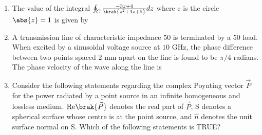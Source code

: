 \documentclass[a4paper, 11pt]{article}
\begin{document}
\begin{enumerate}
    \begin{enumerate}
    \end{enumerate}

    \hfill{}

    \item The value of the integral $\oint_{C}\frac{-3z+4}{\brak{z^{2}+4z+5}}dz$ where c is the circle $\abs{z}=1$ is given by
    
    \begin{enumerate}
    \end{enumerate}

    \hfill{}

    \item A transmission line of characteristic impedance $50$ \ohm is terminated by a $50$ \ohm load. When excited by a sinusoidal voltage source at $10$ GHz, the phase difference between two points spaced $2$ mm apart on the line is found to be $\pi/4$ radians. The phase velocity of the wave along the line is
    
    \begin{enumerate}
    \end{enumerate}

    \hfill{}

    \item Consider the following statements regarding the complex Poynting vector $\vec{P}$ for the power radiated by a point source in an infinite homogeneous and lossless medium. $\text{Re}\brak{\vec{P}}$ denotes the real part of $\vec{P}$, S denotes a spherical surface whose centre is at the point source, and $\hat{n}$ denotes the unit surface normal on S. Which of the following statements is TRUE?
    

\end{enumerate}
\end{document}
